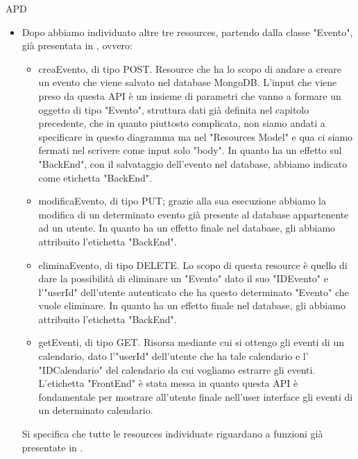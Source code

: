 \begin{listaPersonale} {APD}
\begin{listaPersonale2}[APD]{}
\begin{itemize}
\begin{itemize}
                  \end{itemize}
                  Si specifica che gli attributi "link", "password" e "schema" sono necessari per poter effettuare la connessione con il database MongoDB, come specificato in , e tutte le resources individuate riguardano a funzioni già presentate sempre in .
            \item Dopo abbiamo individuato altre tre resources, partendo dalla classe "Evento", già presentata in , ovvero:
                  \begin{itemize}
                      \item creaEvento, di tipo POST. Resource che ha lo scopo di andare a creare un evento che viene salvato nel database MongoDB. L'input che viene preso da questa API è un insieme di parametri che vanno a formare un oggetto di tipo "Evento", struttura dati già definita nel capitolo precedente, che in quanto piuttosto complicata, non siamo andati a specificare in questo diagramma ma nel "Resources Model" e qua ci siamo fermati nel scrivere come input solo "body". In quanto ha un effetto sul "BackEnd", con il salvataggio dell'evento nel database, abbiamo indicato come etichetta "BackEnd".
                      \item modificaEvento, di tipo PUT; grazie alla sua esecuzione abbiamo la modifica di un determinato evento già presente al database appartenente ad un utente. In quanto ha un effetto finale nel database, gli abbiamo attribuito l'etichetta "BackEnd".
                      \item eliminaEvento, di tipo DELETE. Lo scopo di questa resource è quello di dare la possibilità di eliminare un "Evento" dato il suo "IDEvento" e l'"userId" dell'utente autenticato che ha questo determinato "Evento" che vuole eliminare. In quanto ha un effetto finale nel database, gli abbiamo attribuito l'etichetta "BackEnd".
                      \item getEventi, di tipo GET. Risorsa mediante cui si ottengo gli eventi di un calendario, dato l'"userId" dell'utente che ha tale calendario e l' "IDCalendario" del calendario da cui vogliamo estrarre gli eventi. L'etichetta "FrontEnd" è stata messa in quanto questa API è fondamentale per mostrare all'utente finale nell'user interface gli eventi di un determinato calendario.
                  \end{itemize}
                  Si specifica che tutte le resources individuate riguardano a funzioni già presentate in .

\end{itemize}
\end{listaPersonale2}
\end{listaPersonale}
